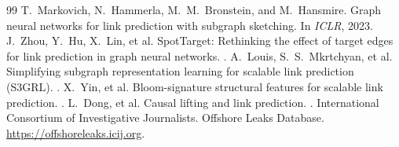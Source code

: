 \documentclass[sigconf]{acmart}
\begin{document}
\begin{thebibliography}{99}
T.~Markovich, N.~Hammerla, M.~M.~Bronstein, and M.~Hansmire.
\newblock Graph neural networks for link prediction with subgraph sketching.
\newblock In \emph{ICLR}, 2023. %
 J.~Zhou, Y.~Hu, X.~Lin, et al.
\newblock SpotTarget: Rethinking the effect of target edges for link prediction
in graph neural networks.
. %
 A.~Louis, S.~S.~Mkrtchyan, et al.
\newblock Simplifying subgraph representation learning for scalable link
prediction (S3GRL).
. %
 X.~Yin, et al.
\newblock Bloom-signature structural features for scalable link prediction.
. %
 L.~Dong, et al.
\newblock Causal lifting and link prediction.
. %
 International Consortium of Investigative Journalists.
\newblock Offshore Leaks Database. \url{https://offshoreleaks.icij.org}.
\end{thebibliography}
\end{document}
